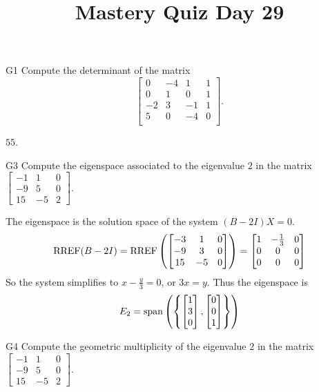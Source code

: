 \documentclass{sbgLAquiz}
\title{Mastery Quiz Day 29 }
\begin{document}
\begin{problem}{G1}
Compute the determinant of the matrix
\[
  \begin{bmatrix}
    0 & -4 & 1 & 1 \\
    0 & 1 & 0 & 1 \\
    -2 & 3 & -1 & 1 \\
    5 & 0 & -4 & 0 \\
  \end{bmatrix}
.\]
\end{problem}
\begin{solution}
\(55\).
\end{solution}

\begin{problem}{G3}
Compute the eigenspace associated to the eigenvalue $2$ in the matrix $\begin{bmatrix} -1 & 1 & 0 \\ -9 & 5 & 0 \\ 15 & -5 & 2 \end{bmatrix}$.
\end{problem}

\begin{solution}
The eigenspace is the solution space of the system $(B-2I)X=0$.
$$\operatorname{RREF}(B-2I)=\operatorname{RREF}\left(\begin{bmatrix} -3 & 1 & 0 \\ -9 & 3 & 0 \\ 15 & - 5 & 0 \end{bmatrix} \right) = \begin{bmatrix} 1 & -\frac{1}{3} & 0 \\ 0 & 0 & 0 \\ 0 & 0 & 0 \end{bmatrix}$$
So the system simplifies to $x-\frac{y}{3}=0$, or $3x=y$.  Thus the eigenspace is $$E_2 = {\rm span}\left( \left\{ \begin{bmatrix} 1 \\ 3 \\ 0 \end{bmatrix}, \begin{bmatrix} 0 \\ 0 \\ 1\end{bmatrix} \right\} \right)$$
\end{solution}
\begin{extract}\newpage\end{extract}
\begin{problem}{G4}
Compute the geometric multiplicity of the eigenvalue $2$ in the matrix $\begin{bmatrix} -1 & 1 & 0 \\ -9 & 5 & 0 \\ 15 & -5 & 2 \end{bmatrix}$.
\end{problem}
\end{document}
